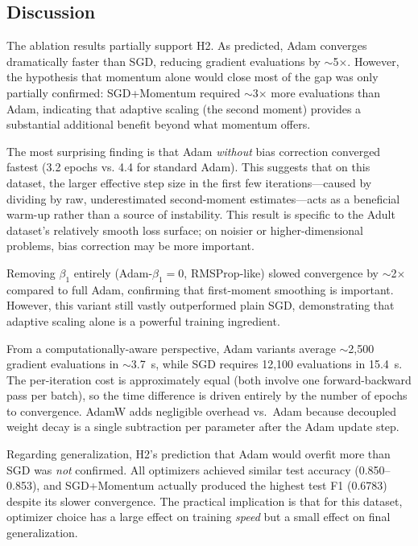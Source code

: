 \documentclass[10 pt, twocolumn]{article}
\begin{document}
\subsection{Discussion}

The ablation results partially support H2. As predicted, Adam converges dramatically faster than SGD, reducing gradient evaluations by $\sim$5$\times$. However, the hypothesis that momentum alone would close most of the gap was only partially confirmed: SGD+Momentum required $\sim$3$\times$ more evaluations than Adam, indicating that adaptive scaling (the second moment) provides a substantial additional benefit beyond what momentum offers.

The most surprising finding is that Adam \textit{without} bias correction converged fastest (3.2 epochs vs. 4.4 for standard Adam). This suggests that on this dataset, the larger effective step size in the first few iterations---caused by dividing by raw, underestimated second-moment estimates---acts as a beneficial warm-up rather than a source of instability. This result is specific to the Adult dataset's relatively smooth loss surface; on noisier or higher-dimensional problems, bias correction may be more important.

Removing $\beta_1$ entirely (Adam-$\beta_1 = 0$, RMSProp-like) slowed convergence by $\sim$2$\times$ compared to full Adam, confirming that first-moment smoothing is important. However, this variant still vastly outperformed plain SGD, demonstrating that adaptive scaling alone is a powerful training ingredient.

From a computationally-aware perspective, Adam variants average $\sim$2{,}500 gradient evaluations in $\sim$3.7~s, while SGD requires 12{,}100 evaluations in 15.4~s. The per-iteration cost is approximately equal (both involve one forward-backward pass per batch), so the time difference is driven entirely by the number of epochs to convergence. AdamW adds negligible overhead vs.\ Adam because decoupled weight decay is a single subtraction per parameter after the Adam update step.

Regarding generalization, H2's prediction that Adam would overfit more than SGD was \textit{not} confirmed. All optimizers achieved similar test accuracy (0.850--0.853), and SGD+Momentum actually produced the highest test F1 (0.6783) despite its slower convergence. The practical implication is that for this dataset, optimizer choice has a large effect on training \textit{speed} but a small effect on final generalization.
\end{document}
